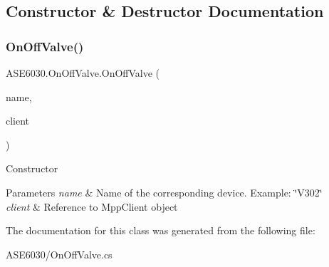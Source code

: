 \subsection{Constructor \& Destructor Documentation}
\mbox{\label{class_a_s_e6030_1_1_on_off_valve_a210880c9d65d53684d468e0290b84772}} 
\subsubsection{\texorpdfstring{On\+Off\+Valve()}{OnOffValve()}}
{\footnotesize\ttfamily A\+S\+E6030.\+On\+Off\+Valve.\+On\+Off\+Valve (\begin{DoxyParamCaption}\item[{String}]{name,  }\item[{ref Tut.\+Mpp\+Opc\+Ua\+Client\+Lib.\+Mpp\+Client}]{client }\end{DoxyParamCaption})\hspace{0.3cm}{\ttfamily [inline]}}



Constructor 


\begin{DoxyParams}{Parameters}
{\em name} & Name of the corresponding device. Example\+: \char`\"{}\+V302\char`\"{}\\
\hline
{\em client} & Reference to Mpp\+Client object\\
\hline
\end{DoxyParams}


The documentation for this class was generated from the following file\+:\begin{DoxyCompactItemize}
\item 
A\+S\+E6030/On\+Off\+Valve.\+cs\end{DoxyCompactItemize}
